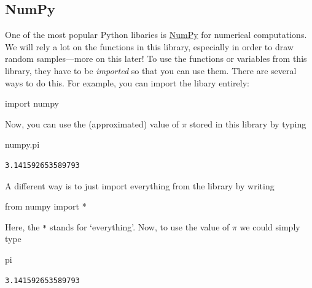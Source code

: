 \documentclass[
  a4paperpaper,
  ,captions=tableheading
]{scrbook}
\newenvironment{Shaded}{\begin{snugshade}}{\end{snugshade}}
\newcommand{\ImportTok}[1]{\textcolor[rgb]{0.00,0.46,0.62}{#1}}
\newcommand{\NormalTok}[1]{\textcolor[rgb]{0.00,0.23,0.31}{#1}}
\newcommand{\OperatorTok}[1]{\textcolor[rgb]{0.37,0.37,0.37}{#1}}
\begin{document}
\hypertarget{numpy}{%
\subsection{NumPy}\label{numpy}}

One of the most popular Python libaries is
\href{https://numpy.org/}{NumPy} for numerical computations. We will
rely a lot on the functions in this library, especially in order to draw
random samples---more on this later! To use the functions or variables
from this library, they have to be \emph{imported} so that you can use
them. There are several ways to do this. For example, you can import the
libary entirely:

\begin{Shaded}
\begin{Highlighting}[]
\ImportTok{import}\NormalTok{ numpy}
\end{Highlighting}
\end{Shaded}

Now, you can use the (approximated) value of \(\pi\) stored in this
library by typing

\begin{Shaded}
\begin{Highlighting}[]
\NormalTok{numpy.pi}
\end{Highlighting}
\end{Shaded}

\begin{verbatim}
3.141592653589793
\end{verbatim}

A different way is to just import everything from the library by writing

\begin{Shaded}
\begin{Highlighting}[]
\ImportTok{from}\NormalTok{ numpy }\ImportTok{import} \OperatorTok{*} 
\end{Highlighting}
\end{Shaded}

Here, the \texttt{*} stands for `everything'. Now, to use the value of
\(\pi\) we could simply type

\begin{Shaded}
\begin{Highlighting}[]
\NormalTok{pi}
\end{Highlighting}
\end{Shaded}

\begin{verbatim}
3.141592653589793
\end{verbatim}
\end{document}
